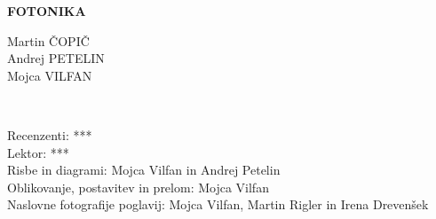 \documentclass[11pt,fleqn]{book} %
\begin{document}
\let\cleardoublepage\clearpage
\makeatletter
\setlength{\@fptop}{0pt}
\makeatother




\begingroup
\thispagestyle{empty}
\centering
\vspace*{5cm}
\par\normalfont\fontsize{35}{35}\sffamily\selectfont
\textbf{FOTONIKA}\\
{\LARGE }\par %
\vspace*{1cm}
\vspace*{1cm}
\vspace*{8cm}
{\Large Martin ČOPIČ \\Andrej PETELIN \\Mojca VILFAN \\}\par %
\endgroup


\newpage
~\vfill
\thispagestyle{empty}


 Recenzenti: {***}\\ %

 Lektor: {***}\\ %

 Risbe in diagrami: Mojca Vilfan in Andrej Petelin\\ %
 
 Oblikovanje, postavitev in prelom: Mojca Vilfan \\ %

 Naslovne fotografije poglavij: Mojca Vilfan, Martin Rigler in Irena Drevenšek\\ %
\end{document}
